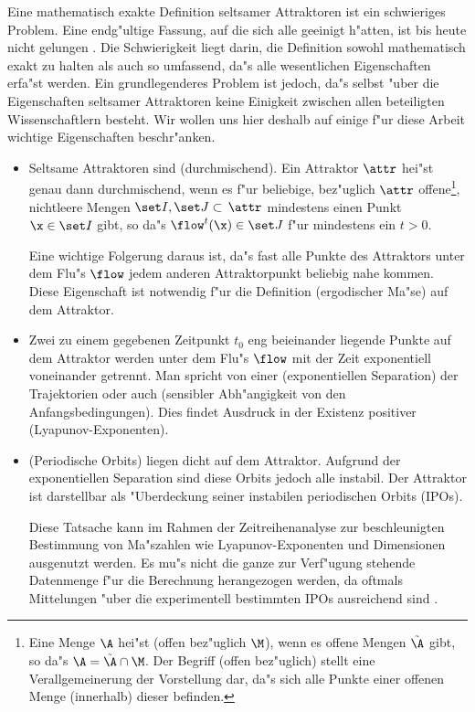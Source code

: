 Eine mathematisch exakte Definition seltsamer Attraktoren ist ein schwieriges
Problem. Eine endg"ultige Fassung, auf die sich alle geeinigt h"atten, ist bis heute nicht
gelungen \cite{Pawelzik91}. Die Schwierigkeit liegt darin, die Definition sowohl
mathematisch exakt zu halten als auch so umfassend, da"s alle wesentlichen Eigenschaften
erfa"st werden. Ein grundlegenderes Problem ist jedoch, da"s selbst "uber die
Eigenschaften seltsamer Attraktoren keine Einigkeit zwischen allen beteiligten Wissenschaftlern
besteht. Wir wollen uns hier deshalb auf einige f"ur diese 
Arbeit wichtige Eigenschaften beschr"anken. 
\begin{itemize}

\item Seltsame Attraktoren sind \begriff(durchmischend). 
Ein Attraktor $\attr$  hei"st genau dann durchmischend, wenn es f"ur beliebige,
bez"uglich $\attr$ offene\footnote{Eine Menge $\A$ hei"st 
\begriff(offen bez"uglich $\M$), wenn es offene Mengen $\tilde\A$ gibt, so
da"s $\A=\tilde\A\cap\M$. Der Begriff \naja(offen bez"uglich) stellt eine
Verallgemeinerung der Vorstellung dar, da"s sich alle Punkte einer offenen Menge
\naja(innerhalb) dieser befinden.}, nichtleere  Mengen $\set I,\set J\subset\,\attr$
mindestens einen Punkt $\x\in\set I$ gibt, so da"s $\flow^t(\x)\in\set J$ f"ur mindestens
ein $t>0$.   

Eine wichtige Folgerung daraus ist, da"s fast alle Punkte
des Attraktors unter dem Flu"s $\flow$ jedem anderen Attraktorpunkt beliebig nahe
kommen. Diese Eigenschaft ist notwendig f"ur die Definition \begriff(ergodischer Ma"se)
auf dem Attraktor. 

\item Zwei zu einem gegebenen Zeitpunkt $t_0$ eng beieinander liegende Punkte auf dem Attraktor
werden unter dem Flu"s $\flow$ mit der Zeit exponentiell voneinander getrennt. Man spricht von einer 
\begriff(exponentiellen Separation) der Trajektorien oder auch \begriff(sensibler
Abh"angigkeit von den Anfangsbedingungen). Dies findet Ausdruck in der Existenz positiver
\begriff(Lyapunov-Exponenten).

\item \begriff(Periodische Orbits) liegen dicht auf dem Attraktor. Aufgrund der
exponentiellen Separation sind diese Orbits jedoch alle instabil. Der Attraktor ist
darstellbar als "Uberdeckung seiner instabilen periodischen Orbits (IPOs). 

Diese Tatsache kann im Rahmen der Zeitreihenanalyse zur beschleunigten Bestimmung von
Ma"szahlen wie Lyapunov-Exponenten und Dimensionen ausgenutzt werden. Es mu"s nicht die
ganze zur Verf"ugung stehende Datenmenge f"ur die Berechnung herangezogen werden, da
oftmals Mittelungen "uber die experimentell bestimmten IPOs
ausreichend sind \cite{Pawelzik91,Pawelzik91a}.
\end{itemize}
